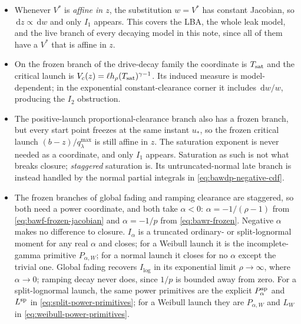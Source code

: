 \documentclass[12pt]{article}
\newcommand{\dd}{\,\mathrm{d}}
\theoremstyle{remark}
\begin{document}
\begin{itemize}
  \item Whenever $V^{*}$ is \emph{affine in $z$}, the substitution $w = V^{*}$ has constant Jacobian, so $\dd z \propto \dd w$ and only $I_1$ appears. This covers the LBA, the whole leak model, and the live branch of every decaying model in this note, since all of them have a $V^{*}$ that is affine in $z$.
  \item On the frozen branch of the drive-decay family the coordinate is $T_{\rm sat}$ and the critical launch is $V_c(z)=\ell h_\rho(T_{\rm sat})^{\gamma-1}$. Its induced measure is model-dependent; in the exponential constant-clearance corner it includes $\dd w/w$, producing the $I_2$ obstruction.
  \item The positive-launch proportional-clearance branch also has a frozen branch, but every start point freezes at the same instant $u_{*}$, so the frozen critical launch $(b-z)/q_{\lambda}^{\max}$ is still affine in $z$. The saturation exponent is never needed as a coordinate, and only $I_1$ appears. Saturation as such is not what breaks closure; \emph{staggered} saturation is. Its untruncated-normal late branch is instead handled by the normal partial integrals in
        \eqref{eq:bawdp-negative-cdf}.
  \item The frozen branches of global fading and ramping clearance are staggered, so both need a power coordinate, and both take $\alpha<0$: $\alpha=-1/(\rho-1)$ from
        \eqref{eq:bawf-frozen-jacobian} and $\alpha=-1/p$ from
        \eqref{eq:bawr-frozen}. Negative $\alpha$ makes no difference to
        closure. $I_\alpha$ is a truncated ordinary- or split-lognormal moment for any real $\alpha$ and closes; for a Weibull launch it is the incomplete-gamma primitive $P_{\alpha,W}$; for a normal launch it closes for no $\alpha$ except the trivial one. Global fading recovers $I_{\log}$ in its exponential limit $\rho\to\infty$, where $\alpha\to0$; ramping decay never does, since $1/p$ is bounded away from zero. For a split-lognormal launch, the same power primitives are the explicit $P_\alpha^{\rm sp}$ and $L^{\rm sp}$ in
        \eqref{eq:split-power-primitives}; for a Weibull launch they are
        $P_{\alpha,W}$ and $L_W$ in \eqref{eq:weibull-power-primitives}.
\end{itemize}
\end{document}
